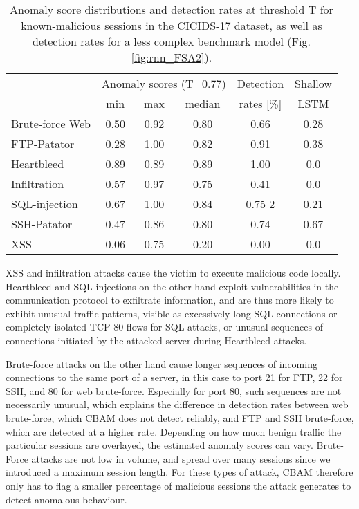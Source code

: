 \begin{table}[ht]
\centering
\begin{tabular}{l|ccc||c|c}
\multicolumn{1}{c|}{ }&\multicolumn{3}{c||}{Anomaly scores (T=0.77)}&Detection&Shallow\\
 &  min  &  max  &  median  & rates [\%] & LSTM\\ 
  \hline
Brute-force Web & 0.50 & 0.92 & 0.80 & 0.66  &0.28 \\ 
  FTP-Patator & 0.28 & 1.00 & 0.82 & 0.91 & 0.38\\ 
  Heartbleed & 0.89 & 0.89 & 0.89 & 1.00 & 0.0\\ 
  Infiltration &0.57& 0.97& 0.75&0.41 &0.0\\ 
  SQL-injection & 0.67 & 1.00 & 0.84 & 0.75 2&0.21\\ 
  SSH-Patator & 0.47 & 0.86 & 0.80 & 0.74 &0.67\\ 
  XSS & 0.06 & 0.75 & 0.20 & 0.00 &0.0\\ 
   \hline
\end{tabular}
\vspace{2pt}
\caption{Anomaly score distributions and detection rates at threshold T for known-malicious sessions in the CICIDS-17 dataset, as well as detection rates for a less complex benchmark model (Fig. \ref{fig:rnn_FSA2}).}
\label{tab:dfCICinf}
\end{table}

XSS and infiltration attacks cause the victim to execute malicious code locally. Heartbleed and SQL injections on the other hand exploit vulnerabilities in the communication protocol to exfiltrate information, and are thus more likely to exhibit unusual traffic patterns, visible as excessively long SQL-connections or completely isolated TCP-80 flows for SQL-attacks, or unusual sequences of connections initiated by the attacked server during Heartbleed attacks.

Brute-force attacks on the other hand cause longer sequences of incoming connections to the same port of a server, in this case to port 21 for FTP, 22 for SSH, and 80 for web brute-force. Especially for port 80, such sequences are not necessarily unusual, which explains the difference in detection rates between web brute-force, which CBAM does not detect reliably, and FTP and SSH brute-force, which are detected at a higher rate. Depending on how much benign traffic the particular sessions are overlayed, the estimated anomaly scores can vary. Brute-Force attacks are not low in volume, and spread over many sessions since we introduced a maximum session length. For these types of attack, CBAM therefore only has to flag a smaller percentage of malicious sessions the attack generates to detect anomalous behaviour.

